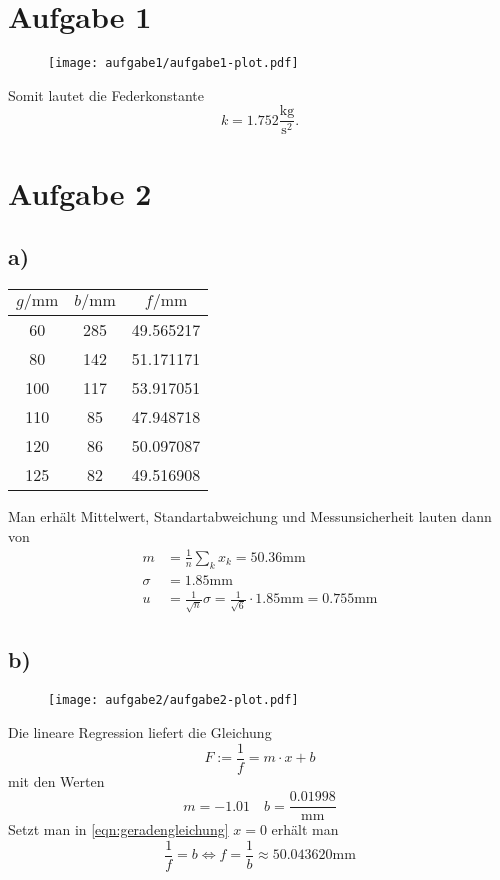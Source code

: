\documentclass{article}
\begin{document}
\section*{Aufgabe 1}
\begin{figure}[H]
	\centering
	\texttt{[image: aufgabe1/aufgabe1-plot.pdf]}
\end{figure}
Somit lautet die Federkonstante
\[
	k = 1.752 \frac{\si{\kg}}{\si{\second^2}}.
\]

\newpage
\section*{Aufgabe 2}
\subsection*{a)}
\begin{table}
	\centering
	\begin{tabular}{c c c}
		\toprule
		$g/\si{\mm}$ & $b/\si{\mm}$ & 
		$f/\si{\mm}$ \\
		\midrule
		60	& 285	& 49.565217 \\
		80	& 142	& 51.171171 \\
		100	& 117	& 53.917051 \\
		110	& 85	& 47.948718 \\
		120	& 86	& 50.097087 \\
		125	& 82	& 49.516908 \\
		\bottomrule
	\end{tabular}
\end{table}

Man erhält Mittelwert, Standartabweichung und Messunsicherheit lauten
dann von
\begin{align*}
	m &= \frac{1}{n} \sum_k x_k =  50.36\si\mm
	\\
	\sigma &= 1.85 \si\mm
	\\
	u &= \frac{1}{\sqrt{n}} \sigma 
	= \frac{1}{\sqrt{6}} \cdot 1.85\si\mm
	= 0.755 \si\mm
\end{align*}

\subsection*{b)}

\begin{figure}[H]
	\centering
	\texttt{[image: aufgabe2/aufgabe2-plot.pdf]}
\end{figure}

Die lineare Regression liefert die Gleichung
\begin{equation}
	F := \frac{1}{f} = m\cdot x + b
	\label{eqn:geradengleichung}
\end{equation}
mit den Werten
\[
	m = -1.01 \quad b = \frac{0.01998}{\si\mm}
\]
Setzt man in \autoref{eqn:geradengleichung} $x=0$ erhält man
\[
	\frac{1}{f} = b \Leftrightarrow
	f = \frac{1}{b} \approx 50.043620 \si\mm
\]
\end{document}
